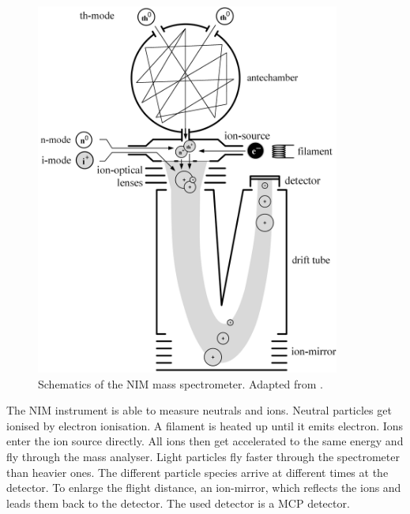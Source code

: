 	\begin{figure}[htb] %
		\centering
		\includegraphics[width= 10cm]{Bilder/NIM_Sketch.png} %
		\caption{Schematics of the NIM mass spectrometer. Adapted from \cite{Diss_Meyer}.}
		\label{fig:NIMSketch}
	\end{figure}

	The NIM instrument is able to measure neutrals and ions. Neutral particles get ionised by electron ionisation. A filament is heated up until it emits electron. Ions enter the ion source directly.  %
	All ions then get accelerated to the same energy and fly through the mass analyser. Light particles fly faster through the spectrometer than heavier ones. The different particle species arrive at different times at the detector. To enlarge the flight distance, an ion-mirror, which reflects the ions and leads them back to the detector. The used detector is a MCP detector. %
	
